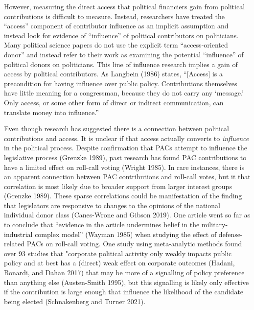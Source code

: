 \documentclass[12pt,]{article}
\begin{document}
However, measuring the direct access that political financiers gain from
political contributions is difficult to measure. Instead, researchers
have treated the ``access'' component of contributor influence as an
implicit assumption and instead look for evidence of ``influence'' of
political contributors on politicians. Many political science papers do
not use the explicit term ``access-oriented donor'' and instead refer to
their work as examining the potential ``influence'' of political donors
on politicians. This line of influence research implies a gain of access
by political contributors. As Langbein (1986) states, ``{[}Access{]} is
a precondition for having influence over public policy. Contributions
themselves have little meaning for a congressman, because they do not
carry any `message.' Only access, or some other form of direct or
indirect communication, can translate money into influence.''

Even though research has suggested there is a connection between
political contributions and access. It is unclear if that access
actually converts to \emph{influence} in the political process. Despite
confirmation that PACs attempt to influence the legislative process
(Grenzke 1989), past research has found PAC contributions to have a
limited effect on roll-call voting (Wright 1985). In rare instances,
there is an apparent connection between PAC contributions and roll-call
votes, but it that correlation is most likely due to broader support
from larger interest groups (Grenzke 1989). These sparse correlations
could be manifestation of the finding that legislators are responsive to
changes to the opinions of the national individual donor class
(Canes-Wrone and Gibson 2019). One article went so far as to conclude
that ``evidence in the article undermines belief in the
military-industrial complex model'' (Wayman 1985) when studying the
effect of defense-related PACs on roll-call voting. One study using
meta-analytic methods found over 93 studies that "corporate political
activity only weakly impacts public policy and at best has a (direct)
weak effect on corporate outcomes (Hadani, Bonardi, and Dahan 2017) that
may be more of a signalling of policy preference than anything else
(Austen-Smith 1995), but this signalling is likely only effective if the
contribution is large enough that influence the likelihood of the
candidate being elected (Schnakenberg and Turner 2021).
\end{document}
